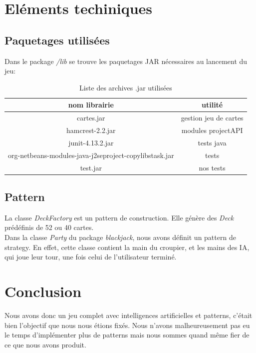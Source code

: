 \documentclass[french,12pt]{article}
\begin{document}
\section{Eléments techiniques} \label{elemtech}

\subsection{Paquetages utilisées}

Dans le package \textsl{/lib} se trouve les paquetages JAR nécessaires au lancement du jeu:

\begin{table}[h]
	\begin{center}
		\begin{tabular}{| c | c |}
			\hline
			\textbf{nom librairie} & \textbf{utilité} \\
			\hline
  			cartes.jar & gestion jeu de cartes \\
 			\hline
  			hamcrest-2.2.jar & modules projectAPI \\
  			\hline
  			junit-4.13.2.jar & tests java \\
  			\hline
  			org-netbeans-modules-java-j2seproject-copylibstask.jar & tests\\
  			\hline
  			test.jar & nos tests \\
  			\hline
 		\end{tabular}
		\caption{Liste des archives .jar utilisées}
	\end{center}
\end{table}

\subsection{Pattern}

La classe \textsl{DeckFactory} est un pattern de construction. Elle génère des \textsl{Deck} prédéfinis de 52 ou 40 cartes.\\
Dans la classe \textsl{Party} du package \textsl{blackjack}, nous avons définit un pattern de strategy. En effet, cette classe contient la main du croupier, et les mains des IA, qui joue leur tour, une fois celui de l'utilisateur terminé.


\section{Conclusion} \label{conclusion}

Nous avons donc un jeu complet avec intelligences artificielles et patterns, c'était bien l'objectif que nous nous étions fixés. Nous n'avons malheureusement pas eu le temps d'implémenter plus de patterns mais nous sommes quand même fier de ce que nous avons produit.
\end{document}
